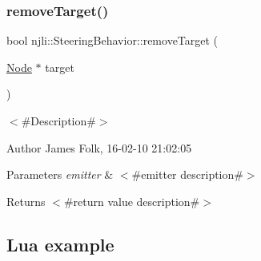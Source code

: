 \begin{DoxyCodeInclude}
\end{DoxyCodeInclude}
\mbox{\label{classnjli_1_1_steering_behavior_a54b6a2a46d2918d0941475f0e75d84ab}} 
\subsubsection{\texorpdfstring{remove\+Target()}{removeTarget()}}
{\footnotesize\ttfamily bool njli\+::\+Steering\+Behavior\+::remove\+Target (\begin{DoxyParamCaption}\item[{\mbox{\hyperlink{classnjli_1_1_node}{Node}} $\ast$}]{target }\end{DoxyParamCaption})}



$<$\#\+Description\#$>$ 

\begin{DoxyAuthor}{Author}
James Folk, 16-\/02-\/10 21\+:02\+:05
\end{DoxyAuthor}

\begin{DoxyParams}{Parameters}
{\em emitter} & $<$\#emitter description\#$>$\\
\hline
\end{DoxyParams}
\begin{DoxyReturn}{Returns}
$<$\#return value description\#$>$
\end{DoxyReturn}
\hypertarget{classnjli_1_1_steering_behavior_wander_ex1}{}\subsection{Lua example}\label{classnjli_1_1_steering_behavior_wander_ex1}

\begin{DoxyCodeInclude}
\end{DoxyCodeInclude}
\mbox{\label{classnjli_1_1_steering_behavior_aa8494cb4a327c0040f64cfe8b393786e}} 
